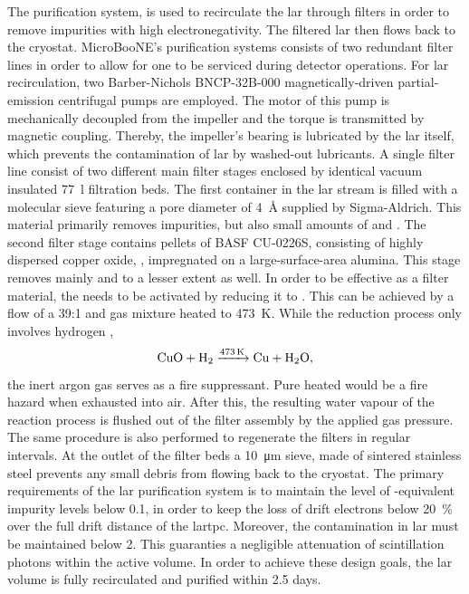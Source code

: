 The purification system, is used to recirculate the \gls{lar} through filters in order to remove impurities with high \gls{electronegativity}. The filtered \gls{lar} then flows back to the cryostat. MicroBooNE's purification systems consists of two redundant filter lines in order to allow for one to be serviced during detector operations. For \gls{lar} recirculation, two Barber-Nichols BNCP-32B-000 magnetically-driven partial-emission centrifugal pumps are employed. The motor of this pump is mechanically decoupled from the impeller and the torque is transmitted by magnetic coupling. Thereby, the impeller's bearing is lubricated by the \gls{lar} itself, which prevents the contamination of \gls{lar} by washed-out lubricants. A single filter line consist of two different main filter stages enclosed by identical vacuum insulated \SI{77}{\litre} filtration beds. The first container in the \gls{lar} stream is filled with a molecular sieve featuring a pore diameter of \SI{4}{\angstrom} supplied by Sigma-Aldrich. This material primarily removes  impurities, but also small amounts of  and . The second filter stage contains pellets of BASF CU-0226S, consisting of highly dispersed copper oxide, , impregnated on a large-surface-area alumina. This stage removes mainly  and to a lesser extent  as well. In order to be effective as a filter material, the  needs to be activated by reducing it to . This can be achieved by a flow of a 39:1  and  gas mixture heated to \SI{473}{\kelvin}. While the reduction process only involves hydrogen \cite{LArFilterRegeneration}, \ie
\begin{equation}
    \ce{CuO + H2 ->[\SI{473}{\kelvin}] Cu + H2O},
\end{equation}
the inert argon gas serves as a fire suppressant. Pure heated  would be a fire hazard when exhausted into air. After this, the resulting water vapour of the reaction process is flushed out of the filter assembly by the applied gas pressure. The same procedure is also performed to regenerate the filters in regular intervals. At the outlet of the filter beds a \SI{10}{\micro\metre} sieve, made of sintered stainless steel prevents any small debris from flowing back to the cryostat. The primary requirements of the \gls{lar} purification system is to maintain the level of -equivalent impurity levels below \SI{0.1}{\ppm}, in order to keep the loss of drift electrons below \SI{20}{\percent} over the full drift distance of the \gls{lartpc}. Moreover, the  contamination in \gls{lar} must be maintained below \SI{2}{\ppm}. This guaranties a negligible attenuation of scintillation photons within the active volume. In order to achieve these design goals, the \gls{lar} volume is fully recirculated and purified within \num{2.5} days.

